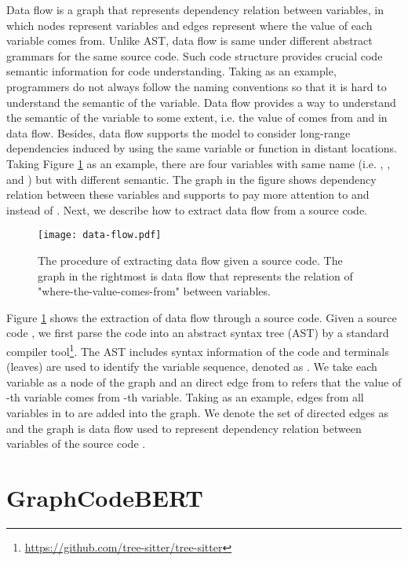 \documentclass{article} \usepackage{iclr2021_conference,times}
\begin{document}
Data flow is a graph that represents dependency relation between variables, in which nodes represent variables and edges represent where the value of each variable comes from.
Unlike AST, data flow is same under different abstract grammars for the same source code.
Such code structure provides crucial code semantic information for code understanding. 
Taking {} as an example, programmers do not always follow the naming conventions so that it is hard to understand the semantic of the variable. Data flow provides a way to understand the semantic of the variable   to some extent,  i.e. the value of  comes from  and  in data flow.
Besides, data flow supports the model to consider long-range dependencies induced by using the same variable or function in distant locations. Taking Figure \ref{figure-data-flow} as an example, there are four variables with same name (i.e. , ,  and ) but with different semantic. The graph in the figure shows dependency relation between these variables and supports  to pay more attention to  and  instead of . Next, we describe how to extract data flow from a source code.


\begin{figure}[h]
\begin{center}
		\texttt{[image: data-flow.pdf]}
		\caption{The procedure of extracting data flow given a source code. The graph in the rightmost is data flow that represents the relation of "where-the-value-comes-from" between variables.}
		\label{figure-data-flow}
	\end{center}

\end{figure}

Figure \ref{figure-data-flow} shows the extraction of data flow through a source code.
Given a source code , we first parse the code into an abstract syntax tree (AST) by a standard compiler tool\footnote{\url{https://github.com/tree-sitter/tree-sitter}}. The AST includes syntax information of the code and terminals (leaves) are used to identify the variable sequence, denoted as .  
We take each variable as a node of the graph and an direct edge  from  to  refers that the value of -th variable comes from -th variable.
Taking  as an example, edges from all variables in  to  are added into the graph. We denote the set of directed edges as  and the graph  is data flow used to represent dependency relation between variables of the source code . 



\section{GraphCodeBERT}
\label{GraphCodeBERT}
\end{document}
